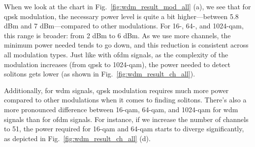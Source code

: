 When we look at the chart in Fig.~\ref{fig:wdm_result_mod_all} (a), we see that for \acrshort{qpsk} modulation, the necessary power level is quite a bit higher—between 5.8 dBm and 7 dBm—compared to other modulations. For 16-, 64-, and 1024-\acrshort{qam}, this range is broader: from 2 dBm to 6 dBm. As we use more channels, the minimum power needed tends to go down, and this reduction is consistent across all modulation types. Just like with \acrshort{ofdm} signals, as the complexity of the modulation increases (from \acrshort{qpsk} to 1024-\acrshort{qam}), the power needed to detect solitons gets lower (as shown in Fig.~\ref{fig:wdm_result_ch_all}).

Additionally, for \acrshort{wdm} signals, \acrshort{qpsk} modulation requires much more power compared to other modulations when it comes to finding solitons. There's also a more pronounced difference between 16-\acrshort{qam}, 64-\acrshort{qam}, and 1024-\acrshort{qam} for \acrshort{wdm} signals than for \acrshort{ofdm} signals. For instance, if we increase the number of channels to 51, the power required for 16-\acrshort{qam} and 64-\acrshort{qam} starts to diverge significantly, as depicted in Fig.~\ref{fig:wdm_result_ch_all} (d).

